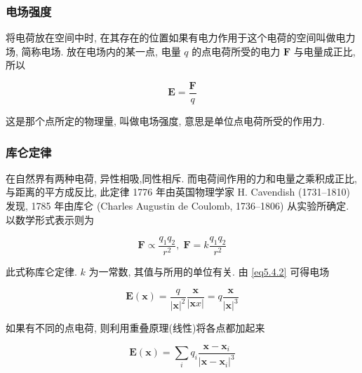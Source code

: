 \documentclass[aspectratio=2516]{beamer}
\begin{document}

\begin{frame}
\frametitle{ \kaishu 电场强度}

\kaishu

将电荷放在空间中时, 在其存在的位置如果有电力作用于这个电荷的空间叫做电力场, 简称电场. 放在电场内的某一点, 电量 $ q $ 的点电荷所受的电力 $ \boldsymbol{F} $ 与电量成正比, 所以

\begin{equation}
\boldsymbol{E} = \frac{\boldsymbol{F}}{q}
\label{eq5.4.1}
\end{equation}

这是那个点所定的物理量, 叫做电场强度, 意思是单位点电荷所受的作用力. 

\end{frame}



\begin{frame}
\frametitle{ \kaishu 库仑定律}

\kaishu

\small

在自然界有两种电荷, 异性相吸,同性相斥. 而电荷间作用的力和电量之乘积成正比, 与距离的平方成反比, 此定律 1776 年由英国物理学家 H. Cavendish (1731--1810) 发现, 1785 年由库仑 (Charles Augustin de Coulomb, 1736--1806) 从实验所确定. 以数学形式表示则为 

\begin{equation}
\boldsymbol{F} \propto \frac{{{q_1}{q_2}}}{{{r^2}}},\;\boldsymbol{F} = k\frac{{{q_1}{q_2}}}{{{r^2}}}
\label{eq5.4.2}
\end{equation}

此式称库仑定律. $ k $ 为一常数, 其值与所用的单位有关. 由 \ref{eq5.4.2} 可得电场

\begin{equation}
\boldsymbol{E}\left( \boldsymbol{x} \right) = \frac{q}{{{{\left| \boldsymbol{x} \right|}^2}}}\frac{\boldsymbol{x}}{{\left| \boldsymbol{x}x \right|}} = q\frac{\boldsymbol{x}}{{{{\left| \boldsymbol{x} \right|}^3}}}
\label{eq5.4.3}
\end{equation}

如果有不同的点电荷, 则利用重叠原理(线性)将各点都加起来

\begin{equation}
\boldsymbol{E}\left( \boldsymbol{x} \right) = \sum\limits_i {{q_i}\frac{{\boldsymbol{x} - {\boldsymbol{x}_i}}}{{{{\left| {\boldsymbol{x} - {\boldsymbol{x}_i}} \right|}^3}}}} 
\label{eq5.4.4}
\end{equation}

\end{frame}
\end{document}
